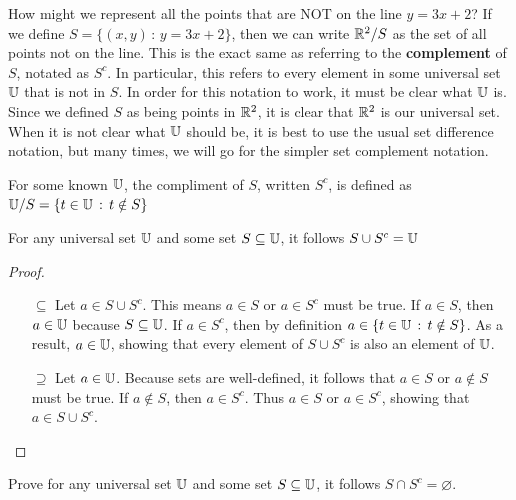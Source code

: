 How might we represent all the points that are NOT on the line $y=3x+2$? If we define $S=\{(x,y)\,:\,y=3x+2\}$, then we can write $\mathbb{R}^2 / S$ as the set of all points not on the line. This is the exact same as referring to the \textbf{complement} of $S$, notated as $S^c$. In particular, this refers to every element in some universal set $\U$ that is not in $S$. In order for this notation to work, it must be clear what $\U$ is. Since we defined $S$ as being points in $\mathbb{R}^2$, it is clear that $\mathbb{R}^2$ is our universal set. When it is not clear what $\U$ should be, it is best to use the usual set difference notation, but many times, we will go for the simpler set complement notation. \\

\begin{definition}
	For some known $\U$, the compliment of $S$, written $S^c$, is defined as \\$\mathbb{U} / S=\{t\in\mathbb{U}\,:\,t\notin S\}$
\end{definition}

\begin{theorem}
	For any universal set $\U$ and some set $S\subseteq\U$, it follows $S\cup S^c=\U$
\end{theorem}
\begin{proof}
	\begin{itemize}
		Let $\U$ be given and assume some set $S\subseteq\U$. To show $S\cup S^c=\U$, we will prove $S\cup S^c\subseteq\U$ and $S\cup S^c\supseteq\U$
		\item[$\subseteq$] Let $a\in S\cup S^c$. This means $a\in S$ or $a\in S^c$ must be true. If $a\in S$, then $a\in \mathbb{U}$ because $S\subseteq \U$. If $a\in S^c$, then by definition $a\in \{t\in\mathbb{U}\,:\,t\notin S\}$. As a result, $a\in \mathbb{U}$, showing that every element of $S\cup S^c$ is also an element of $\U$. 
		\item[$\supseteq$] Let $a\in \mathbb{U}$. Because sets are well-defined, it follows that $a\in S$ or $a\notin S$ must be true. If $a\notin S$, then $a\in S^c$. Thus $a\in S$ or $a\in S^c$, showing that $a\in S\cup S^c$. 
	\end{itemize}
\end{proof}

\begin{exercise}
	Prove for any universal set $\U$ and some set $S\subseteq\U$, it follows $S\cap S^c=\varnothing$.
\end{exercise}
    \vspace{-3mm}

